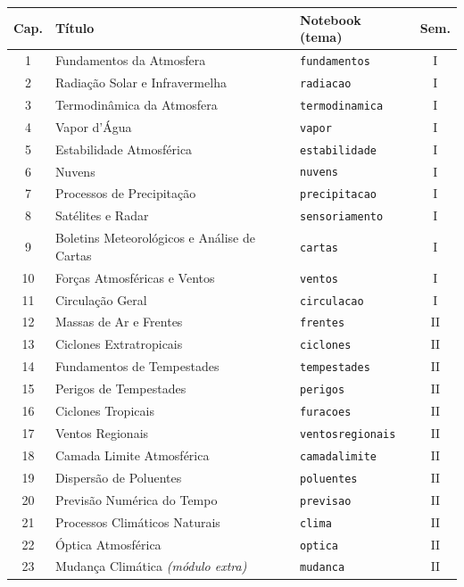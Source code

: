 \documentclass[11pt]{article}
\begin{document}
\begin{center}
\begin{tabular}{cllc}
\hline
Cap. & Título & Notebook (tema) & Sem. \\
\hline
1 & Fundamentos da Atmosfera & \texttt{fundamentos} & I \\
2 & Radiação Solar e Infravermelha & \texttt{radiacao} & I \\
3 & Termodinâmica da Atmosfera & \texttt{termodinamica} & I \\
4 & Vapor d'Água & \texttt{vapor} & I \\
5 & Estabilidade Atmosférica & \texttt{estabilidade} & I \\
6 & Nuvens & \texttt{nuvens} & I \\
7 & Processos de Precipitação & \texttt{precipitacao} & I \\
8 & Satélites e Radar & \texttt{sensoriamento} & I \\
9 & Boletins Meteorológicos e Análise de Cartas & \texttt{cartas} & I \\
10 & Forças Atmosféricas e Ventos & \texttt{ventos} & I \\
11 & Circulação Geral & \texttt{circulacao} & I \\
\hline
12 & Massas de Ar e Frentes & \texttt{frentes} & II \\
13 & Ciclones Extratropicais & \texttt{ciclones} & II \\
14 & Fundamentos de Tempestades & \texttt{tempestades} & II \\
15 & Perigos de Tempestades & \texttt{perigos} & II \\
16 & Ciclones Tropicais & \texttt{furacoes} & II \\
17 & Ventos Regionais & \texttt{ventosregionais} & II \\
18 & Camada Limite Atmosférica & \texttt{camadalimite} & II \\
19 & Dispersão de Poluentes & \texttt{poluentes} & II \\
20 & Previsão Numérica do Tempo & \texttt{previsao} & II \\
21 & Processos Climáticos Naturais & \texttt{clima} & II \\
22 & Óptica Atmosférica & \texttt{optica} & II \\
23 & Mudança Climática \emph{(módulo extra)} & \texttt{mudanca} & II \\
\hline
\end{tabular}
\end{center}
\end{document}
